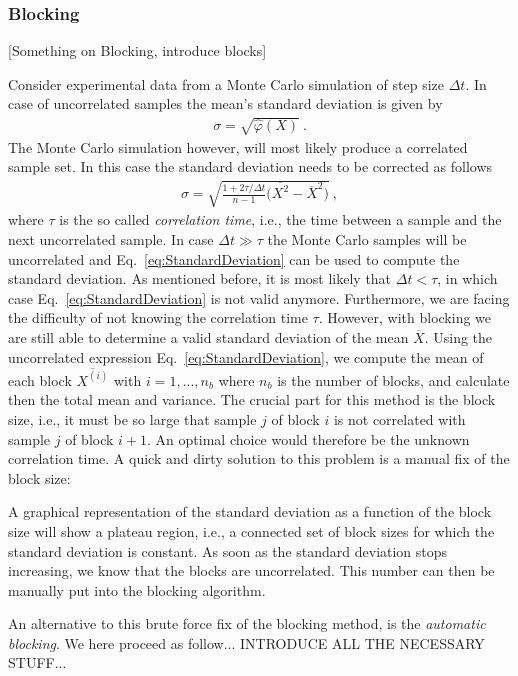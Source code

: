 \documentclass[11pt,a4paper]{article}
\numberwithin{equation}{section}
\begin{document}
\subsubsection{Blocking}
%
%
[Something on Blocking, introduce blocks]

Consider experimental data from a Monte Carlo simulation of step size $\Delta t$. 
%
In case of uncorrelated samples the mean's standard deviation is given by
\begin{align}
\label{eq:StandardDeviation}
\sigma 
=
\sqrt{
\hat \varphi(X)
}~.
\end{align}
The Monte Carlo simulation however, will most likely produce a correlated sample set.
%
In this case the standard deviation needs to be corrected as follows  
\begin{align*}
\sigma
=
\sqrt{
\frac{1+2\tau/\Delta t}{n-1}\Big(\overline{X^2}-\overline{X}^2\Big)
}~,
\end{align*}
where $\tau$ is the so called {\it correlation time}, i.e., the time between a sample and the next uncorrelated sample.
%
In case $\Delta t\gg\tau$ the Monte Carlo samples will be uncorrelated and Eq.~\eqref{eq:StandardDeviation} can be used to compute the standard deviation.
%
As mentioned before, it is most likely that $\Delta t<\tau$, in which case Eq.~\eqref{eq:StandardDeviation} is not valid anymore. 
%
Furthermore, we are facing the difficulty of not knowing the correlation time $\tau$.
%
However, with blocking we are still able to determine a valid standard deviation of the mean $\overline{X}$.
%
Using the uncorrelated expression Eq.~\eqref{eq:StandardDeviation}, we compute the mean of each block $\overline{X^{(i)}}$ with $i=1,...,n_{b}$ where $n_b$ is the number of blocks, and calculate then the total mean and variance.
%
The crucial part for this method is the block size, i.e., it must be so large that sample $j$ of block $i$ is not correlated with sample $j$ of block $i+1$.
%
An optimal choice would therefore be the unknown correlation time. 
%
A quick and dirty solution to this problem is a manual fix of the block size:

A graphical representation of the standard deviation as a function of the block size will show a plateau region, i.e., a connected set of block sizes for which the standard deviation is constant. 
%
As soon as the standard deviation stops increasing, we know that the blocks are uncorrelated. 
%
This number can then be manually put into the blocking algorithm. 

% 
An alternative to this brute force fix of the blocking method, is the {\it automatic blocking}.
%
We here proceed as follow... INTRODUCE ALL THE NECESSARY STUFF...
\end{document}
